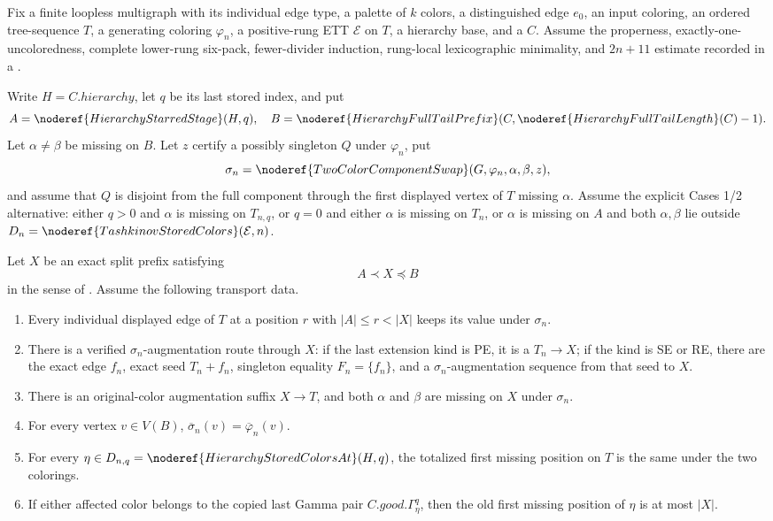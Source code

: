 \begin{lemma}
Fix a finite loopless multigraph with its individual edge type, a palette
of \(k\) colors, a distinguished edge \(e_0\), an input coloring, an
ordered tree-sequence \(T\), a generating coloring \(\varphi_n\), a
positive-rung ETT \(\mathcal E\) on \(T\), a hierarchy base, and a
 \(C\).  Assume the properness,
exactly-one-uncoloredness, complete lower-rung six-pack, fewer-divider
induction, rung-local lexicographic minimality, and \(2n+11\) estimate
recorded in a
.

Write \(H=C.\mathit{hierarchy}\), let \(q\) be its last stored index, and
put
\[
 A=\noderef{HierarchyStarredStage}(H,q),\quad
 B=\noderef{HierarchyFullTailPrefix}
       (C,\noderef{HierarchyFullTailLength}(C)-1).
\]
Let \(\alpha\ne\beta\) be missing on \(B\).  Let \(z\) certify a possibly
singleton  \(Q\) under \(\varphi_n\), put
\[
 \sigma_n=\noderef{TwoColorComponentSwap}
      (G,\varphi_n,\alpha,\beta,z),
\]
and assume that \(Q\) is disjoint from the full component through the
first displayed vertex of \(T\) missing \(\alpha\).  Assume the explicit
Cases 1/2 alternative: either \(q>0\) and \(\alpha\) is missing on
\(T_{n,q}\), or \(q=0\) and either \(\alpha\) is missing on \(T_n\), or
\(\alpha\) is missing on \(A\) and both \(\alpha,\beta\) lie outside
\(D_n=\noderef{TashkinovStoredColors}(\mathcal E,n)\).

Let \(X\) be an exact split prefix satisfying
\[
             A\prec X\preccurlyeq B
\]
in the sense of .  Assume the
following transport data.
\begin{enumerate}
\item Every individual displayed edge of \(T\) at a position \(r\) with
\(|A|\le r<|X|\) keeps its value under \(\sigma_n\).
\item There is a verified \(\sigma_n\)-augmentation route through \(X\):
if the last extension kind is PE, it is a
 \(T_n\longrightarrow X\); if the
kind is SE or RE, there are the exact edge \(f_n\), exact seed
\(T_n+f_n\), singleton equality \(F_n=\{f_n\}\), and a
\(\sigma_n\)-augmentation sequence from that seed to \(X\).
\item There is an original-color augmentation suffix
\(X\longrightarrow T\), and both \(\alpha\) and \(\beta\) are missing on
\(X\) under \(\sigma_n\).
\item For every vertex \(v\in V(B)\),
\(\overline\sigma_n(v)=\overline\varphi_n(v)\).
\item For every \(\eta\in D_{n,q}=\noderef{HierarchyStoredColorsAt}(H,q)\),
the totalized first missing position on \(T\) is the same under the two
colorings.
\item If either affected color belongs to the copied last Gamma pair
\(C.\mathit{good}.\Gamma^q_\eta\), then the old first missing position of
\(\eta\) is at most \(|X|\).
\end{enumerate}


\end{lemma}
